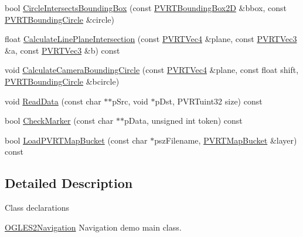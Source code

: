 \begin{DoxyCompactItemize}
\item 
bool \hyperlink{class_o_g_l_e_s2_navigation_a747a8962a37835a955d41cf2459630b3}{Circle\+Intersects\+Bounding\+Box} (const \hyperlink{struct_p_v_r_t_bounding_box2_d}{P\+V\+R\+T\+Bounding\+Box2\+D} \&bbox, const \hyperlink{struct_p_v_r_t_bounding_circle}{P\+V\+R\+T\+Bounding\+Circle} \&circle)
\item 
float \hyperlink{class_o_g_l_e_s2_navigation_ac0e730bad4b94d56b27b3307bd25329e}{Calculate\+Line\+Plane\+Intersection} (const \hyperlink{struct_p_v_r_t_vec4}{P\+V\+R\+T\+Vec4} \&plane, const \hyperlink{struct_p_v_r_t_vec3}{P\+V\+R\+T\+Vec3} \&a, const \hyperlink{struct_p_v_r_t_vec3}{P\+V\+R\+T\+Vec3} \&b) const 
\item 
void \hyperlink{class_o_g_l_e_s2_navigation_af1e10fa746d3e0bdf7c0166507393759}{Calculate\+Camera\+Bounding\+Circle} (const \hyperlink{struct_p_v_r_t_vec4}{P\+V\+R\+T\+Vec4} \&plane, const float shift, \hyperlink{struct_p_v_r_t_bounding_circle}{P\+V\+R\+T\+Bounding\+Circle} \&bcircle)
\item 
void \hyperlink{class_o_g_l_e_s2_navigation_a8b857a482b37ad9b23ef476bcfcf6c7a}{Read\+Data} (const char $\ast$$\ast$p\+Src, void $\ast$p\+Dst, P\+V\+R\+Tuint32 size) const 
\item 
bool \hyperlink{class_o_g_l_e_s2_navigation_a6226b1139d0783b3e7d319500b597763}{Check\+Marker} (const char $\ast$$\ast$p\+Data, unsigned int token) const 
\item 
bool \hyperlink{class_o_g_l_e_s2_navigation_abd32c6e0d0efa5e7d2595848e020f6e1}{Load\+P\+V\+R\+T\+Map\+Bucket} (const char $\ast$psz\+Filename, \hyperlink{struct_p_v_r_t_map_bucket}{P\+V\+R\+T\+Map\+Bucket} \&layer) const 
\end{DoxyCompactItemize}


\subsection{Detailed Description}


 Class declarations



  \hyperlink{class_o_g_l_e_s2_navigation}{O\+G\+L\+E\+S2\+Navigation}  Navigation demo main class. 

